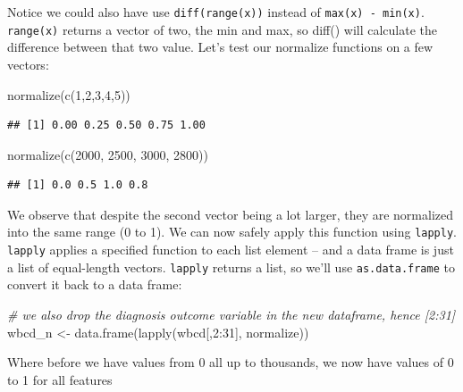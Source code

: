 \documentclass[
]{article}
\newenvironment{Shaded}{\begin{snugshade}}{\end{snugshade}}
\newcommand{\CommentTok}[1]{\textcolor[rgb]{0.56,0.35,0.01}{\textit{#1}}}
\newcommand{\DecValTok}[1]{\textcolor[rgb]{0.00,0.00,0.81}{#1}}
\newcommand{\FunctionTok}[1]{\textcolor[rgb]{0.00,0.00,0.00}{#1}}
\newcommand{\NormalTok}[1]{#1}
\newcommand{\OtherTok}[1]{\textcolor[rgb]{0.56,0.35,0.01}{#1}}
\newcommand{\SpecialCharTok}[1]{\textcolor[rgb]{0.00,0.00,0.00}{#1}}
\begin{document}
Notice we could also have use \texttt{diff(range(x))} instead of
\texttt{max(x)\ -\ min(x)}. \texttt{range(x)} returns a vector of two,
the min and max, so diff() will calculate the difference between that
two value. Let's test our normalize functions on a few vectors:

\begin{Shaded}
\begin{Highlighting}[]
\FunctionTok{normalize}\NormalTok{(}\FunctionTok{c}\NormalTok{(}\DecValTok{1}\NormalTok{,}\DecValTok{2}\NormalTok{,}\DecValTok{3}\NormalTok{,}\DecValTok{4}\NormalTok{,}\DecValTok{5}\NormalTok{))}
\end{Highlighting}
\end{Shaded}

\begin{verbatim}
## [1] 0.00 0.25 0.50 0.75 1.00
\end{verbatim}

\begin{Shaded}
\begin{Highlighting}[]
\FunctionTok{normalize}\NormalTok{(}\FunctionTok{c}\NormalTok{(}\DecValTok{2000}\NormalTok{, }\DecValTok{2500}\NormalTok{, }\DecValTok{3000}\NormalTok{, }\DecValTok{2800}\NormalTok{))}
\end{Highlighting}
\end{Shaded}

\begin{verbatim}
## [1] 0.0 0.5 1.0 0.8
\end{verbatim}

We observe that despite the second vector being a lot larger, they are
normalized into the same range (0 to 1). We can now safely apply this
function using \texttt{lapply}. \texttt{lapply} applies a specified
function to each list element -- and a data frame is just a list of
equal-length vectors. \texttt{lapply} returns a list, so we'll use
\texttt{as.data.frame} to convert it back to a data frame:

\begin{Shaded}
\begin{Highlighting}[]
\CommentTok{\# we also drop the diagnosis outcome variable in the new dataframe, hence [2:31]}
\NormalTok{wbcd\_n }\OtherTok{\textless{}{-}} \FunctionTok{data.frame}\NormalTok{(}\FunctionTok{lapply}\NormalTok{(wbcd[,}\DecValTok{2}\SpecialCharTok{:}\DecValTok{31}\NormalTok{], normalize))}
\end{Highlighting}
\end{Shaded}

Where before we have values from 0 all up to thousands, we now have
values of 0 to 1 for all features
\end{document}

